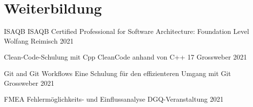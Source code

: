 
\section{Weiterbildung}
\begin{cvhonors}

\cvhonor
{ISAQB} %
{ISAQB Certified Professional for
Software Architecture: Foundation Level} %
{Wolfang Reimisch} %
{2021} %


\cvhonor
{Clean-Code-Schulung mit Cpp} %
{CleanCode anhand von C++ 17} %
{Grossweber} %
{2021} %

\cvhonor
{Git and Git Workflows} %
{Eine Schulung für den effizienteren Umgang mit Git} %
{Grossweber} %
{2021} %

\cvhonor
{FMEA} %
{Fehlermöglichkeits- und Einflussanalyse} %
{DGQ-Veranstaltung} %
{2021} %

\end{cvhonors}